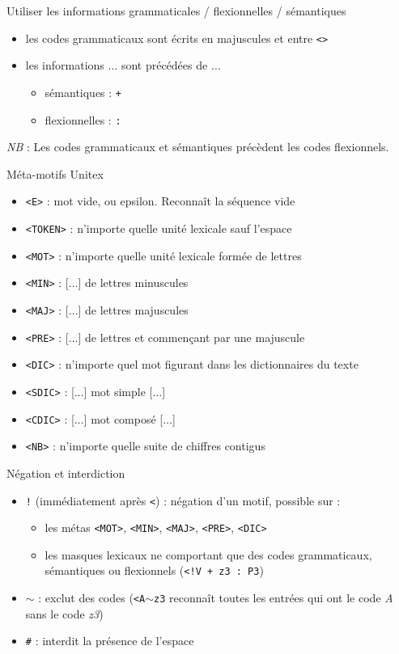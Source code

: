 \documentclass[xetex,xcolor={table,usenames,dvipsnames}]{beamer}
\begin{document}
\begin{frame}{Utiliser les informations grammaticales / flexionnelles / sémantiques}
	\begin{itemize}
		\item les codes grammaticaux sont écrits en majuscules et entre \texttt{<>}
		\item les informations $\dots$ sont précédées de $\dots$ 
		\begin{itemize}
			\item sémantiques : \og{}\texttt{+}\fg{}
			\item flexionnelles : \og{}\texttt{:}\fg{}
		\end{itemize}
	\end{itemize}
	\textit{NB} : Les codes grammaticaux et sémantiques précèdent les codes flexionnels.
\end{frame}
\begin{frame}{Méta-motifs Unitex}
	\begin{itemize}
		\item \texttt{<E>} : mot vide, ou epsilon. Reconnaît la séquence vide
		\item \texttt{<TOKEN>} : n'importe quelle unité lexicale sauf l'espace
		\item \texttt{<MOT>} : n'importe quelle unité lexicale formée de lettres
		\item \texttt{<MIN>} : [$\dots$] de lettres minuscules
		\item \texttt{<MAJ>} : [$\dots$] de lettres majuscules
		\item \texttt{<PRE>} : [$\dots$] de lettres et commençant par une majuscule
		\item \texttt{<DIC>} : n'importe quel mot figurant dans les dictionnaires du texte
		\item \texttt{<SDIC>} : [$\dots$] mot simple [$\dots$]
		\item \texttt{<CDIC>} : [$\dots$] mot composé [$\dots$] 
		\item \texttt{<NB>} : n'importe quelle suite de chiffres contigus
	\end{itemize}
\end{frame}

\begin{frame}{Négation et interdiction}
	\begin{itemize}
		\item \texttt{!} (immédiatement après \texttt{<}) : négation d'un motif, possible sur :
		\begin{itemize}
			\item les métas \texttt{<MOT>}, \texttt{<MIN>}, \texttt{<MAJ>}, \texttt{<PRE>}, \texttt{<DIC>}
			\item les masques lexicaux ne comportant que des codes grammaticaux, sémantiques ou flexionnels (\texttt{<!V + z3 : P3})
		\end{itemize}
		\item \texttt{$\sim$} : exclut des codes (\texttt{<A$\sim$z3} reconnaît toutes les entrées qui ont le code \textit{A} sans le code \textit{z3})
		\item \texttt{\#} : interdit la présence de l'espace
	\end{itemize}
\end{frame}
\end{document}
